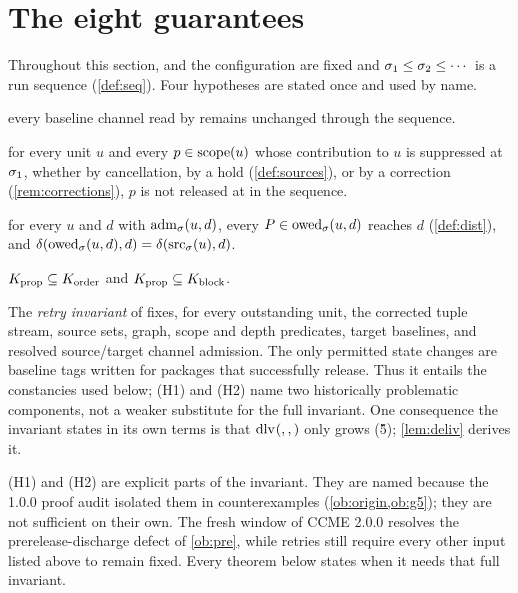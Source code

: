 \section{The eight guarantees}
\label{sec:guarantees}

Throughout this section, \Head{} and the configuration are fixed and
$\sigma_1 \leq \sigma_2 \leq \cdots$ is a run sequence (\cref{def:seq}). Four
hypotheses are stated once and used by name.

\begin{description}[leftmargin=3.4em,style=nextline,font=\normalfont\bfseries]
  \item[(H1) stable inherited-channel state] every baseline channel read by
     remains unchanged through the sequence.
  \item[(H2) no suppressed source is released] for every unit $u$ and every
    $p \in \mathrm{scope}(u)$ whose contribution to $u$ is suppressed at $\sigma_1$,
    whether by cancellation, by a hold (\cref{def:sources}), or by a correction
    (\cref{rem:corrections}), $p$ is not released at \Head{} in the
    sequence.
  \item[(R) owed sources reach their target] for every $u$ and $d$ with
    $\mathrm{adm}_{\sigma}(u,d)$, every $P \in \mathrm{owed}_{\sigma}(u,d)$ reaches $d$
    (\cref{def:dist}), and $\delta(\mathrm{owed}_{\sigma}(u,d),d) =
    \delta(\mathrm{src}_{\sigma}(u),d)$.
  \item[(K) propagation edges order and block] $K_{\mathrm{prop}} \subseteq K_{\mathrm{order}}$ and
    $K_{\mathrm{prop}} \subseteq K_{\mathrm{block}}$.
\end{description}

The \emph{retry invariant} of  fixes, for every outstanding unit,
the corrected tuple stream, source sets, graph, scope and depth predicates,
target baselines, and resolved source/target channel admission. The only
permitted state changes are baseline tags written for packages that
successfully release. Thus it entails the constancies used below; (H1) and
(H2) name two historically problematic components, not a weaker substitute
for the full invariant. One consequence the invariant states in its own terms
is that $\mathrm{dlv}_{}(,,)$ only grows (\G{5}); \cref{lem:deliv} derives it.

(H1) and (H2) are explicit parts of the invariant. They are named because the
1.0.0 proof audit isolated them in counterexamples (\cref{ob:origin,ob:g5});
they are not sufficient on their own. The fresh window of CCME 2.0.0 resolves
the prerelease-discharge defect of \cref{ob:pre}, while retries still require
every other input listed above to remain fixed. Every theorem below states when
it needs that full invariant.

